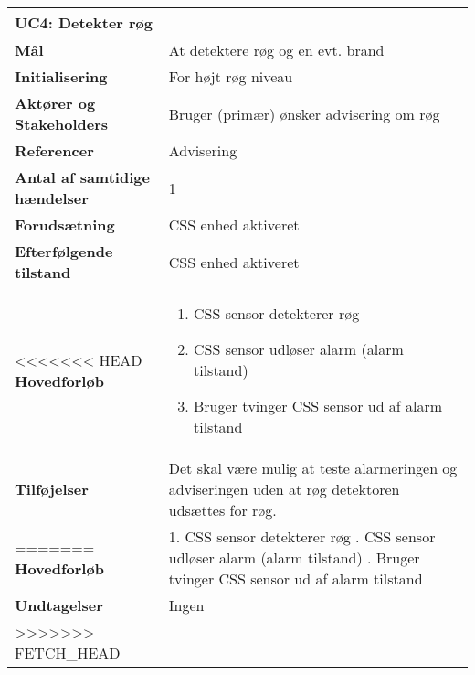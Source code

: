 \begin{table}[H] \centering
\begin{tabular}{|p{6cm}|p{8cm}|}
	\hline
\multicolumn{2}{|l|}{\textbf{UC4: Detekter røg}} \\\hline
\textbf{Mål}								&At detektere røg og en evt. brand \\\hline
\textbf{Initialisering}					&For højt røg niveau\\\hline
\textbf{Aktører og Stakeholders}			&Bruger (primær) ønsker advisering om røg \\\hline
\textbf{Referencer}						&Advisering \\\hline
\textbf{Antal af samtidige hændelser}	&1 \\\hline
\textbf{Forudsætning}					&CSS enhed aktiveret  \\\hline
\textbf{Efterfølgende tilstand}			&CSS enhed aktiveret \\\hline
<<<<<<< HEAD
\textbf{Hovedforløb}						&\begin{enumerate}
\item CSS sensor detekterer røg 

\item CSS sensor udløser alarm (alarm tilstand)

\item Bruger tvinger CSS sensor ud af alarm tilstand

\end{enumerate}\\\hline

\textbf{Tilføjelser}						&Det skal være mulig at teste alarmeringen og adviseringen uden at røg detektoren udsættes for røg.\\\hline
=======
\textbf{Hovedforløb}						&   
1. CSS sensor detekterer røg \newline 
2. CSS sensor udløser alarm (alarm tilstand) \newline 
3. Bruger tvinger CSS sensor ud af alarm tilstand\\\hline
\textbf{Undtagelser}						&Ingen \\\hline
>>>>>>> FETCH_HEAD
	\end{tabular}
	\label{UC4} 
\end{table}